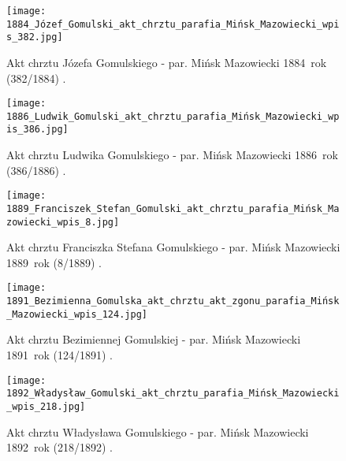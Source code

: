 \begin{figure}[!ht]
    \vspace*{0.5cm}
    \centering \texttt{[image: 
        1884\_Józef\_Gomulski\_akt\_chrztu\_parafia\_Mińsk\_Mazowiecki\_wpis\_382.jpg]}
    \captionsetup{format=hang}
    \caption{Akt chrztu Józefa Gomulskiego - par. Mińsk Mazowiecki
    1884~rok (382/1884) 
    \cite{par_minsk2}.}
    \label{fig:jgomulski_1884}
\end{figure}

\begin{figure}[!ht]
    \vspace*{0.5cm}
    \centering \texttt{[image: 
        1886\_Ludwik\_Gomulski\_akt\_chrztu\_parafia\_Mińsk\_Mazowiecki\_wpis\_386.jpg]}
    \captionsetup{format=hang}
    \caption{Akt chrztu Ludwika Gomulskiego - par. Mińsk Mazowiecki
    1886~rok (386/1886) 
    \cite{par_minsk2}.}
    \label{fig:lgomulski_1886}
\end{figure}

\begin{figure}[!ht]
    \vspace*{0.5cm}
    \centering \texttt{[image: 
        1889\_Franciszek\_Stefan\_Gomulski\_akt\_chrztu\_parafia\_Mińsk\_Mazowiecki\_wpis\_8.jpg]}
    \captionsetup{format=hang}
    \caption{Akt chrztu Franciszka Stefana Gomulskiego - par. Mińsk Mazowiecki
    1889~rok (8/1889) 
    \cite{par_minsk2}.}
    \label{fig:fsgomulski_1889}
\end{figure}

\begin{figure}[!ht]
    \vspace*{0.5cm}
    \centering \texttt{[image: 
        1891\_Bezimienna\_Gomulska\_akt\_chrztu\_akt\_zgonu\_parafia\_Mińsk\_Mazowiecki\_wpis\_124.jpg]}
    \captionsetup{format=hang}
    \caption{Akt chrztu Bezimiennej Gomulskiej - par. Mińsk Mazowiecki
    1891~rok (124/1891) 
    \cite{par_minsk2}.}
    \label{fig:bgomulska_1891}
\end{figure}

\begin{figure}[!ht]
    \vspace*{0.5cm}
    \centering \texttt{[image: 
        1892\_Władysław\_Gomulski\_akt\_chrztu\_parafia\_Mińsk\_Mazowiecki\_wpis\_218.jpg]}
    \captionsetup{format=hang}
    \caption{Akt chrztu Władysława Gomulskiego - par. Mińsk Mazowiecki
    1892~rok (218/1892) 
    \cite{par_minsk2}.}
    \label{fig:wgomulski_1892}
\end{figure}

